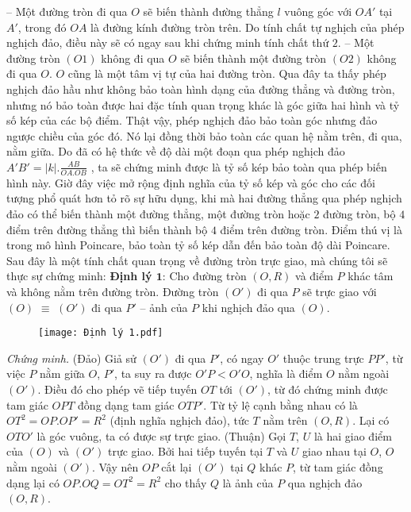 \documentclass{article}
\begin{document}
	\vskip 0.1cm 
	-- Một đường tròn đi qua $O$ sẽ biến thành đường thẳng $l$ vuông góc với $OA'$ tại $A'$, trong đó $OA$ là đường kính đường tròn trên. Do tính chất tự nghịch của phép nghịch đảo, điều này sẽ có ngay sau khi chứng minh tính chất thứ $2$. 
	\vskip 0.1cm
	-- Một đường tròn $(O1)$ không đi qua $O$ sẽ biến thành một đường tròn $(O2)$ không đi qua $O$. $O$ cũng là một tâm vị tự của hai đường tròn. 
	\vskip 0.1cm
	Qua đây ta thấy phép nghịch đảo hầu như không bảo toàn hình dạng của đường thẳng và đường tròn, nhưng nó bảo toàn được hai đặc tính quan trọng khác là góc giữa hai hình và tỷ số kép của các bộ điểm. Thật vậy, phép nghịch đảo bảo toàn góc nhưng đảo ngược chiều của góc đó. Nó lại đồng thời bảo toàn các quan hệ nằm trên, đi qua, nằm giữa. Do đã có hệ thức về độ dài một đoạn qua phép nghịch đảo  $A'B' = |k|. \frac{AB}{OA.OB}$ , ta sẽ chứng minh được là tỷ số kép bảo toàn qua phép biến hình này. Giờ đây việc mở rộng định nghĩa của tỷ số kép và góc cho các đối tượng phổ quát hơn tỏ rõ sự hữu dụng, khi mà hai đường thẳng qua phép nghịch đảo có thể biến thành một đường thẳng, một đường tròn hoặc $2$ đường tròn, bộ $4$ điểm trên đường thẳng thì biến thành bộ $4$ điểm trên đường tròn. Điểm thú vị là trong mô hình Poincare, bảo toàn tỷ số kép dẫn đến bảo toàn độ dài Poincare.
	\vskip 0.1cm
	Sau đây là một tính chất quan trọng về đường tròn trực giao, mà chúng tôi sẽ thực sự chứng minh:
	\vskip 0.1cm
	\textbf{\color{lichsutoanhoc}Định lý $\pmb{1}$}: Cho đường tròn $(O, R)$ và điểm $P$ khác tâm và không nằm trên đường tròn. Đường tròn $(O')$ đi qua $P$ sẽ trực giao với $(O)$ $ \equiv$ $(O')$ đi qua $P'$ -- ảnh của $P$ khi nghịch đảo qua $(O)$.
	\begin{figure}[H]
		\vspace*{-5pt}
		\centering
		\captionsetup{labelformat= empty, justification=centering}
		\texttt{[image: Định lý 1.pdf]}
		\vspace*{-10pt}
	\end{figure}
	\textit{Chứng minh.} (Đảo) Giả sử $(O')$ đi qua $P'$, có ngay $O'$ thuộc trung trực $PP'$, từ việc $P$ nằm giữa $O$, $P'$, ta suy ra được $O'P<O'O$, nghĩa là điểm $O$ nằm ngoài $(O')$. Điều đó cho phép vẽ tiếp tuyến $OT$ tới $(O')$, từ đó chứng minh được tam giác $OPT$ đồng dạng tam giác $OTP'$. Từ tỷ lệ cạnh bằng nhau có là $OT^2 = OP.OP' = R^2$ (định nghĩa nghịch đảo), tức $T$ nằm trên $(O, R)$. Lại có $OTO'$ là góc vuông, ta có được sự trực giao.
	\vskip 0.1cm
	(Thuận) Gọi $T$, $U$ là hai giao điểm của $(O)$ và $(O')$ trực giao. Bởi hai tiếp tuyến tại $T$ và $U$ giao nhau tại $O$, $O$ nằm ngoài $(O')$. Vậy nên $OP$ cắt lại $(O')$ tại $Q$ khác $P$, từ tam giác đồng dạng lại có $OP.OQ = OT^2 = R^2$ cho thấy $Q$ là ảnh của $P$ qua nghịch đảo $(O, R)$.
\end{document}
